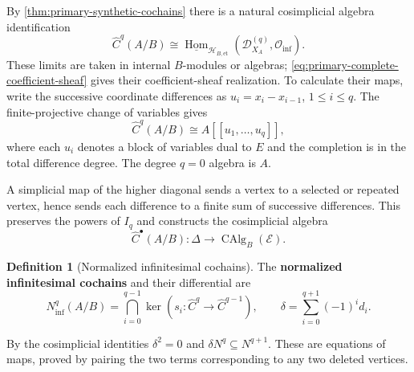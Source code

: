 \documentclass[11pt,a4paper]{article}
\numberwithin{algorithm}{section}
\numberwithin{equation}{section}
\theoremstyle{definition}
\newtheorem{definition}[definition]{Definition}
\theoremstyle{remark}
\theoremstyle{plain}
\newcommand{\E}{\mathcal E}
\newcommand{\CAlg}{\operatorname{CAlg}}
\newcommand{\Hom}{\operatorname{Hom}}
\newcommand{\ThickEt}{\mathscr H_{B,\mathrm{et}}}
\theoremstyle{definition}
\theoremstyle{plain}
\begin{document}
By \cref{thm:primary-synthetic-cochains} there is a natural
cosimplicial algebra identification
\[
 \widehat C^q(A/B)
 \cong\underline{\Hom}_{\ThickEt}
       (\mathcal D_{X_A}^{(q)},\mathcal O_{\mathrm{inf}}).
\]
These limits are taken in internal $B$-modules or algebras;
\eqref{eq:primary-complete-coefficient-sheaf} gives their
coefficient-sheaf realization. To calculate their maps, write
the successive coordinate differences as
$u_i=x_i-x_{i-1}$, $1\le i\le q$. The finite-projective
change of variables gives
\begin{equation}\label{eq:completed-nerve-coordinates}
 \widehat C^q(A/B)
 \cong A[[u_1,\ldots,u_q]],
\end{equation}
where each $u_i$ denotes a block of variables dual to $E$ and
the completion is in the total difference degree.  The degree
$q=0$ algebra is $A$.

A simplicial map of the higher diagonal sends a vertex to a
selected or repeated vertex, hence sends each difference to a finite
sum of successive differences.  This preserves the powers of
$I_q$ and constructs the cosimplicial algebra
\[
 \widehat C^\bullet(A/B):\Delta\longrightarrow\CAlg_B(\E).
\]


\begin{definition}[Normalized infinitesimal cochains]\label{def:normalized-cochains}
The \textbf{normalized infinitesimal cochains} and their differential are
\begin{equation}\label{eq:normalized-completed-derham}
 N_{\mathrm{inf}}^q(A/B)
  =\bigcap_{i=0}^{q-1}\ker(s_i:\widehat C^q\to\widehat C^{q-1}),
 \qquad \delta=\sum_{i=0}^{q+1}(-1)^id_i.
\end{equation}
\end{definition}


By the cosimplicial identities $\delta^2=0$ and
$\delta N^q\subseteq N^{q+1}$.  These are equations of maps,
proved by pairing the two terms corresponding to any two
deleted vertices.
\end{document}
